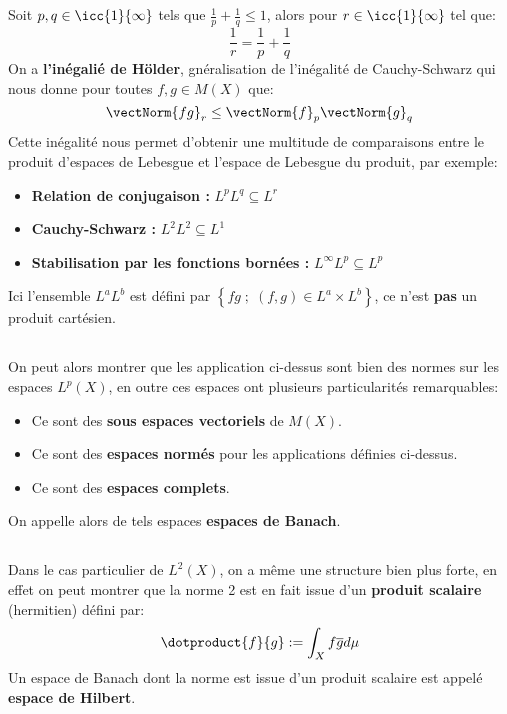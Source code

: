 \subsection*{}
Soit \( p, q \in \icc{1}{ \infty} \) tels que \( \frac{1}{p} + \frac{1}{q} \leq 1 \), alors pour \( r \in \icc{1}{ \infty}\) tel que:
\[ 
   \frac{1}{r} =  \frac{1}{p} + \frac{1}{q}
\]
On a \textbf{l'inégalié de Hölder}, gnéralisation de l'inégalité de Cauchy-Schwarz qui nous donne pour toutes \( f, g \in M(X) \) que:
\[ 
   \vectNorm{fg}_r \leq \vectNorm{f}_p \vectNorm{g}_q
\]
Cette inégalité nous permet d'obtenir une multitude de comparaisons entre le produit d'espaces de Lebesgue et l'espace de Lebesgue du produit, par exemple:
\begin{itemize}
   \item \textbf{Relation de conjugaison : } \( L^pL^q \subseteq L^r \)
   \item \textbf{Cauchy-Schwarz : }\( L^2L^2 \subseteq L^1 \)
   \item \textbf{Stabilisation par les fonctions bornées : }\( L^\infty L^p \subseteq L^p  \)
\end{itemize}
Ici l'ensemble \( L^aL^b \) est défini par \( \left\{ fg \; ; \; (f, g) \in L^a \times L^b \right\}  \), ce n'est \textbf{pas} un produit cartésien.
\subsection*{}
On peut alors montrer que les application ci-dessus sont bien des normes sur les espaces \( L^p(X) \), en outre ces espaces ont plusieurs particularités remarquables:
\begin{itemize}
   \item Ce sont des \textbf{sous espaces vectoriels} de \( M(X) \).
   \item Ce sont des \textbf{espaces normés} pour les applications définies ci-dessus.
   \item Ce sont des \textbf{espaces complets}.
\end{itemize}
On appelle alors de tels espaces \textbf{espaces de Banach}.
\subsection*{}
Dans le cas particulier de \( L^2(X)\), on a même une structure bien plus forte, en effet on peut montrer que la norme 2 est en fait issue d'un \textbf{produit scalaire} (hermitien) défini par:
\[ 
   \dotproduct{f}{g} := \int_X f \overline{g} d \mu  
\]
Un espace de Banach dont la norme est issue d'un produit scalaire est appelé \textbf{espace de Hilbert}.
\pagebreak
